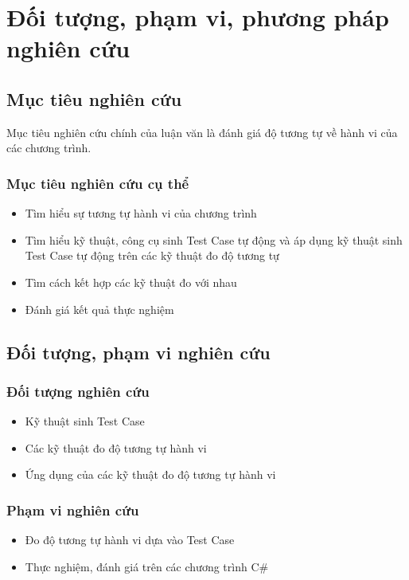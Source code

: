 \section{Đối tượng, phạm vi, phương pháp nghiên cứu}
\subsection*{Mục tiêu nghiên cứu}

Mục tiêu nghiên cứu chính của luận văn là đánh giá độ tương tự về hành vi của các chương trình.
		
\subsubsection*{Mục tiêu nghiên cứu cụ thể}
\begin{itemize}
\item Tìm hiểu sự tương tự hành vi của chương trình
\item Tìm hiểu kỹ thuật, công cụ sinh Test Case tự động và áp dụng kỹ thuật sinh Test Case tự động trên các kỹ thuật đo độ tương tự
\item Tìm cách kết hợp các kỹ thuật đo với nhau
\item Đánh giá kết quả thực nghiệm
\end{itemize}

\subsection*{Đối tượng, phạm vi nghiên cứu}	
\subsubsection*{Đối tượng nghiên cứu}
\begin{itemize}
\item Kỹ thuật sinh Test Case
\item Các kỹ thuật đo độ tương tự hành vi
\item Ứng dụng của các kỹ thuật đo độ tương tự hành vi
\end{itemize}
	
\subsubsection*{Phạm vi nghiên cứu}
\begin{itemize}
\item Đo độ tương tự hành vi dựa vào Test Case
\item Thực nghiệm, đánh giá trên các chương trình C\#
\end{itemize}


